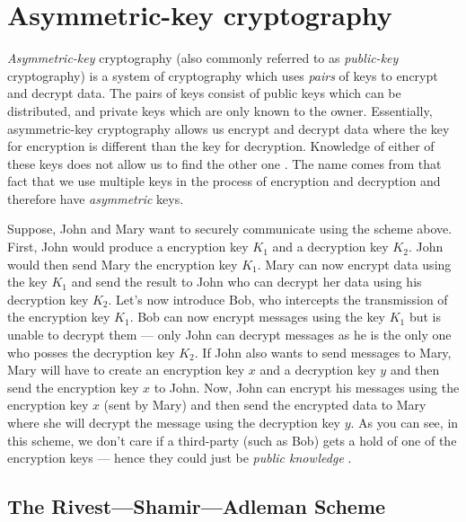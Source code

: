 \chapter{Asymmetric-key cryptography}
\label{Asymmetric-key cryptography} %


\textit{Asymmetric-key} cryptography (also commonly referred to as \textit{public-key} cryptography) is a system of cryptography which uses \textit{pairs} of keys to 
encrypt and decrypt data. The pairs of keys consist of public keys which can be distributed, and private keys which are only known to the owner. Essentially,
asymmetric-key cryptography allows us encrypt and decrypt data where the key for encryption is different than the key for decryption. Knowledge of either
of these keys does not allow us to find the other one \cite{classical_algebra}. The name comes from that fact that we use multiple keys in the process of encryption and decryption
and therefore have \textit{asymmetric} keys.

Suppose, John and Mary want to securely communicate using the scheme above. First, John would produce a encryption key $K_1$ and a decryption key $K_2$. John 
would then send Mary the encryption key $K_1$. Mary can now encrypt data using the key $K_1$ and send the result to John who can decrypt her data using his decryption key
$K_2$. Let's now introduce Bob, who intercepts the transmission of the encryption key $K_1$. Bob can now encrypt messages using the key $K_1$ but is unable to decrypt 
them --- only John can decrypt messages as he is the only one who posses the decryption key $K_2$. If John also wants to send messages to Mary, Mary will have to create
an encryption key $x$ and a decryption key $y$ and then send the encryption key $x$ to John. Now, John can encrypt his messages using the encryption key $x$ (sent by Mary)
and then send the encrypted data to Mary where she will decrypt the message using the decryption key $y$. As you can see, in this scheme, we don't care if a third-party 
(such as Bob) gets a hold of one of the encryption keys --- hence they could just be \textit{public knowledge} \cite{classical_algebra}. 

\section{The Rivest---Shamir---Adleman Scheme}

